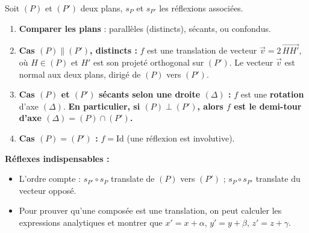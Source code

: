 \documentclass[11pt]{article}
\newcommand{\cle}[1]{{\popxbold\color{popdark}#1}}
\begin{document}
\begin{methode}[Nature de la composée $f=s_{P'}\circ s_{P}$]
Soit $(P)$ et $(P')$ deux plans, $s_{P}$ et $s_{P'}$ les réflexions associées.
\begin{enumerate}
\item \textbf{Comparer les plans} : parallèles (distincts), sécants, ou confondus.
\item \textbf{Cas $(P)\parallel(P')$, distincts :} $f$ est une \cle{translation} de vecteur $\vec{v}=2\,\overrightarrow{H H'}$, où $H\in(P)$ et $H'$ est son projeté orthogonal sur $(P')$. Le vecteur $\vec{v}$ est normal aux deux plans, dirigé de $(P)$ vers $(P')$.
\item \textbf{Cas $(P)$ et $(P')$ sécants selon une droite $(\Delta)$ :} $f$ est une \textbf{rotation} d'axe $(\Delta)$. \textbf{En particulier, si $(P)\perp(P')$, alors $f$ est le \cle{demi-tour} d'axe $(\Delta)=(P)\cap(P')$.}
\item \textbf{Cas $(P)=(P')$ :} $f=\mathrm{Id}$ (une réflexion est involutive).
\end{enumerate}
\textbf{Réflexes indispensables :}
\begin{itemize}
\item L'ordre compte : $s_{P'}\circ s_{P}$ translate de $(P)$ vers $(P')$ ; $s_{P}\circ s_{P'}$ translate du vecteur opposé.
\item Pour prouver qu'une composée est une translation, on peut calculer les expressions analytiques et montrer que $x'=x+\alpha$, $y'=y+\beta$, $z'=z+\gamma$.
\end{itemize}
\end{methode}
\end{document}
